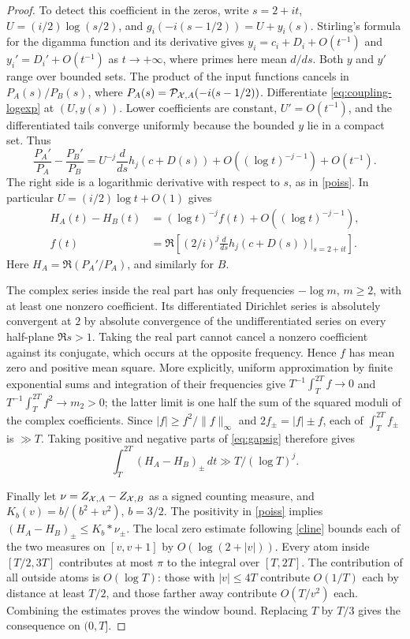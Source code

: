 \begin{proof}
To detect this coefficient in the zeros, write
$s=2+it$, $U=(i/2)\log(s/2)$, and
$g_i(-i(s-1/2))=U+y_i(s)$.
Stirling's formula for the digamma function and its derivative gives
$y_i=c_i+D_i+O(t^{-1})$ and
$y_i'=D_i'+O(t^{-1})$ as $t\to+\infty$, where primes here mean
$d/ds$. Both $y$ and $y'$ range over bounded sets.
The product of the input functions cancels in $P_A(s)/P_B(s)$,
where $P_A(s)=\mathcal P_{\mathcal X,A}(-i(s-1/2))$. Differentiate
\eqref{eq:coupling-logexp} at $(U,y(s))$. Lower coefficients are
constant, $U'=O(t^{-1})$, and the differentiated tails converge
uniformly because the bounded $y$ lie in a compact set. Thus
\[
 \frac{P_A'}{P_A}-\frac{P_B'}{P_B}
  = U^{-j}\frac{d}{ds}h_j(c+D(s))
     +O((\log t)^{-j-1})+O(t^{-1}).
\]
The right side is a logarithmic derivative with respect to $s$, as in
\eqref{poiss}. In particular $U=(i/2)\log t+O(1)$ gives
\begin{align}
 H_A(t)-H_B(t)&=(\log t)^{-j} f(t)+O((\log t)^{-j-1}),\label{eq:gapsig}\\
 f(t)&=\Re\left[ (2/i)^j\frac{d}{ds}h_j(c+D(s))\bigg|_{s=2+it}\right].\nonumber
\end{align}
Here $H_A=\Re(P_A'/P_A)$, and similarly for $B$.

The complex series inside the real part has only frequencies $-\log m$,
$m\ge2$, with at least one nonzero coefficient. Its differentiated
Dirichlet series is absolutely convergent at $2$ by absolute convergence
of the undifferentiated series on every half-plane $\Re s>1$.
Taking the real part cannot cancel a nonzero coefficient against its
conjugate, which occurs at the opposite frequency. Hence $f$ has mean
zero and positive mean square. More explicitly, uniform approximation
by finite exponential sums and integration of their frequencies give
$T^{-1}\int_T^{2T} f\to0$ and
$T^{-1}\int_T^{2T} f^2\to m_2>0$; the latter limit is one half the sum
of the squared moduli of the complex coefficients. Since
$|f|\ge f^2/\|f\|_\infty$ and
$2f_\pm=|f|\pm f$, each of $\int_T^{2T} f_\pm$ is $\gg T$.
Taking positive and negative parts of \eqref{eq:gapsig} therefore gives
\[
 \int_T^{2T}(H_A-H_B)_\pm\,dt \gg T/(\log T)^j .
\]

Finally let $\nu=Z_{\mathcal X,A}-Z_{\mathcal X,B}$ as a signed counting measure,
and $K_b(v)=b/(b^2+v^2)$, $b=3/2$.
The positivity in \eqref{poiss} implies
$(H_A-H_B)_\pm\le K_b*\nu_\pm$.
The local zero estimate following \eqref{cline} bounds each of the
two measures on $[v,v+1]$ by $O(\log(2+|v|))$.
Every atom inside $[T/2,3T]$ contributes at most $\pi$ to the
integral over $[T,2T]$. The contribution of all outside atoms is
$O(\log T)$: those with $|v|\le4T$ contribute $O(1/T)$ each by
distance at least $T/2$, and those farther away contribute $O(T/v^2)$
each. Combining the estimates proves the window bound. Replacing $T$ by
$T/3$ gives the consequence on $(0,T]$.
\end{proof}
